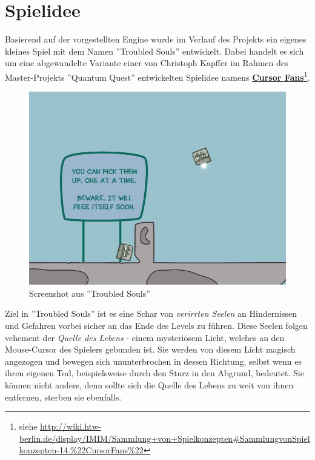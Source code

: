 \chapter{Spielidee}

Basierend auf der vorgestellten Engine wurde im Verlauf des Projekts ein eigenes kleines Spiel mit dem Namen ''Troubled Souls'' entwickelt. Dabei handelt es sich um eine abgewandelte Variante einer von Christoph Kapffer im Rahmen des Master-Projekts ''Quantum Quest'' entwickelten Spielidee namens \textbf{\href{http://wiki.htw-berlin.de/display/IMIM/Sammlung+von+Spielkonzepten\#SammlungvonSpielkonzepten-14.\%22CursorFans\%22}{Cursor Fans}}\footnote{siehe \url{http://wiki.htw-berlin.de/display/IMIM/Sammlung+von+Spielkonzepten\#SammlungvonSpielkonzepten-14.\%22CursorFans\%22}}.

\begin{figure}[h] %
	\centering
		\includegraphics[scale=0.6]{images/screenshot_game.png}
	\caption{Screenshot aus ''Troubled Souls''}
\end{figure}

Ziel in ''Troubled Souls'' ist es eine Schar von \textit{verirrten Seelen} an Hindernissen und Gefahren vorbei sicher an das Ende des Levels zu führen. Diese Seelen folgen vehement der \textit{Quelle des Lebens} - einem mysteriösem Licht, welches an den Mouse-Cursor des Spielers gebunden ist. Sie werden von diesem Licht magisch angezogen und bewegen sich ununterbrochen in dessen Richtung, selbst wenn es ihren eigenen Tod, beispielsweise durch den Sturz in den Abgrund, bedeutet. Sie können nicht anders, denn sollte sich die Quelle des Lebens zu weit von ihnen entfernen, sterben sie ebenfalls.

